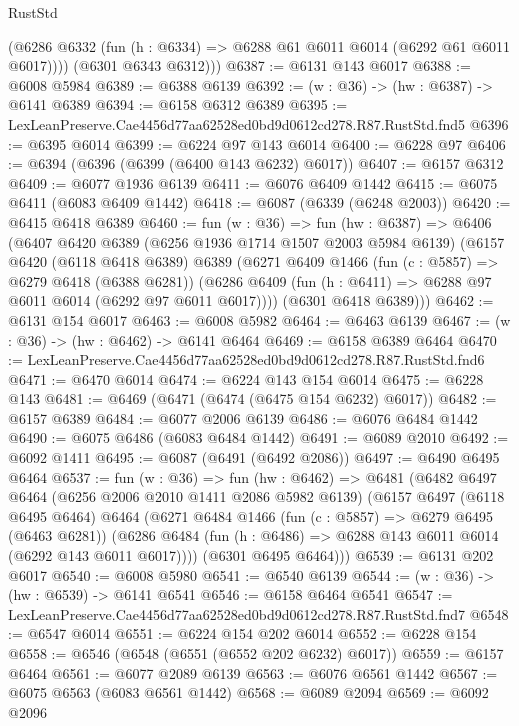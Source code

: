 \begin{lexlean}{RustStd}
\begin{coremodule}
{{          (@6286 @6332 (fun (h : @6334) => @6288 @61 @6011 @6014 (@6292 @61 @6011 @6017))))
        (@6301 @6343 @6312)))
@6387 := @6131 @143 @6017
@6388 := @6008 @5984
@6389 := @6388 @6139
@6392 := (w : @36) -> (hw : @6387) -> @6141 @6389
@6394 := @6158 @6312 @6389
@6395 := LexLeanPreserve.Cae4456d77aa62528ed0bd9d0612cd278.R87.RustStd.fnd5
@6396 := @6395 @6014
@6399 := @6224 @97 @143 @6014
@6400 := @6228 @97
@6406 := @6394 (@6396 (@6399 (@6400 @143 @6232) @6017))
@6407 := @6157 @6312
@6409 := @6077 @1936 @6139
@6411 := @6076 @6409 @1442
@6415 := @6075 @6411 (@6083 @6409 @1442)
@6418 := @6087 (@6339 (@6248 @2003))
@6420 := @6415 @6418 @6389
@6460 := fun (w : @36) =>
  fun (hw : @6387) =>
  @6406
    (@6407
      @6420
      @6389
      (@6256 @1936 @1714 @1507 @2003 @5984 @6139)
      (@6157
        @6420
        (@6118 @6418 @6389)
        @6389
        (@6271
          @6409
          @1466
          (fun (c : @5857) => @6279 @6418 (@6388 @6281))
          (@6286 @6409 (fun (h : @6411) => @6288 @97 @6011 @6014 (@6292 @97 @6011 @6017))))
        (@6301 @6418 @6389)))
@6462 := @6131 @154 @6017
@6463 := @6008 @5982
@6464 := @6463 @6139
@6467 := (w : @36) -> (hw : @6462) -> @6141 @6464
@6469 := @6158 @6389 @6464
@6470 := LexLeanPreserve.Cae4456d77aa62528ed0bd9d0612cd278.R87.RustStd.fnd6
@6471 := @6470 @6014
@6474 := @6224 @143 @154 @6014
@6475 := @6228 @143
@6481 := @6469 (@6471 (@6474 (@6475 @154 @6232) @6017))
@6482 := @6157 @6389
@6484 := @6077 @2006 @6139
@6486 := @6076 @6484 @1442
@6490 := @6075 @6486 (@6083 @6484 @1442)
@6491 := @6089 @2010
@6492 := @6092 @1411
@6495 := @6087 (@6491 (@6492 @2086))
@6497 := @6490 @6495 @6464
@6537 := fun (w : @36) =>
  fun (hw : @6462) =>
  @6481
    (@6482
      @6497
      @6464
      (@6256 @2006 @2010 @1411 @2086 @5982 @6139)
      (@6157
        @6497
        (@6118 @6495 @6464)
        @6464
        (@6271
          @6484
          @1466
          (fun (c : @5857) => @6279 @6495 (@6463 @6281))
          (@6286 @6484 (fun (h : @6486) => @6288 @143 @6011 @6014 (@6292 @143 @6011 @6017))))
        (@6301 @6495 @6464)))
@6539 := @6131 @202 @6017
@6540 := @6008 @5980
@6541 := @6540 @6139
@6544 := (w : @36) -> (hw : @6539) -> @6141 @6541
@6546 := @6158 @6464 @6541
@6547 := LexLeanPreserve.Cae4456d77aa62528ed0bd9d0612cd278.R87.RustStd.fnd7
@6548 := @6547 @6014
@6551 := @6224 @154 @202 @6014
@6552 := @6228 @154
@6558 := @6546 (@6548 (@6551 (@6552 @202 @6232) @6017))
@6559 := @6157 @6464
@6561 := @6077 @2089 @6139
@6563 := @6076 @6561 @1442
@6567 := @6075 @6563 (@6083 @6561 @1442)
@6568 := @6089 @2094
@6569 := @6092 @2096
}}
\end{coremodule}
\end{lexlean}
